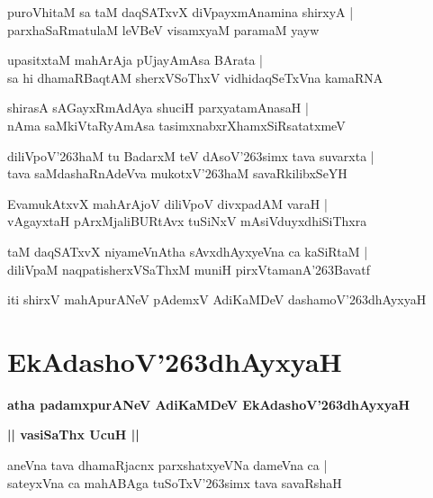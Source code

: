 \documentclass[twoside,12pt,openright]{book}
\def\S{\char'263}
\newcounter{shloka}[chapter]
\def\uvaca#1{\centerline{{\large\textbf{#1}}}}
\begin{document}
\begin{shloka}
puroVhitaM sa taM daqSATxvX diVpayxmAnamina shirxyA |\\
parxhaSaRmatulaM leVBeV visamxyaM paramaM yayw
\end{shloka}

\begin{shloka}
upasitxtaM mahArAja pUjayAmAsa BArata |\\
sa hi dhamaRBaqtAM sherxVSoThxV vidhidaqSeTxVna kamaRNA
\end{shloka}

\begin{shloka}
shirasA sAGayxRmAdAya shuciH parxyatamAnasaH |\\
nAma saMkiVtaRyAmAsa tasimxnabxrXhamxSiRsatatxmeV
\end{shloka}

\begin{shloka}
diliVpoV\S haM tu BadarxM teV dAsoV\S simx tava suvarxta |\\
tava saMdashaRnAdeVva mukotxV\S haM savaRkilibxSeYH
\end{shloka}

\begin{shloka}
EvamukAtxvX mahArAjoV diliVpoV divxpadAM varaH |\\
vAgayxtaH pArxMjaliBURtAvx tuSiNxV mAsiVduyxdhiSiThxra
\end{shloka}

\begin{shloka}
taM daqSATxvX niyameVnAtha sAvxdhAyxyeVna ca kaSiRtaM |\\
diliVpaM naqpatisherxVSaThxM muniH pirxVtamanA\S Bavatf
\end{shloka}

\begin{center}
iti shirxV mahApurANeV pAdemxV AdiKaMDeV dashamoV\S dhAyxyaH
\end{center}

\chapter{EkAdashoV\S dhAyxyaH}

\begin{center}
{\LARGE\bfseries atha padamxpurANeV AdiKaMDeV EkAdashoV\S dhAyxyaH}
\end{center}

\uvaca{|| vasiSaThx UcuH ||}

\begin{shloka}
aneVna  tava dhamaRjacnx parxshatxyeVNa  dameVna ca |\\
sateyxVna ca mahABAga tuSoTxV\S simx tava savaRshaH
\end{shloka}
\end{document}
